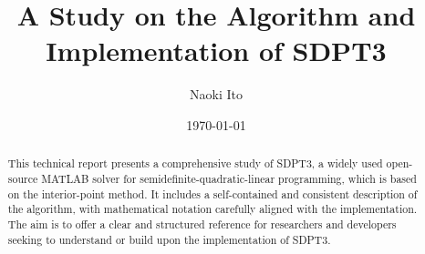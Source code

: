 \documentclass{scrartcl}
\title{A Study on the Algorithm and Implementation of SDPT3}
\author{
    Naoki Ito
}
\date{\today}
\begin{document}
\maketitle
\begin{abstract}
This technical report presents a comprehensive study of SDPT3, a widely used open-source MATLAB solver for semidefinite-quadratic-linear programming, which is based on the interior-point method.
It includes a self-contained and consistent description of the algorithm, with mathematical notation carefully aligned with the implementation.
The aim is to offer a clear and structured reference for researchers and developers seeking to understand or build upon the implementation of SDPT3.
\end{abstract}

\tableofcontents








\appendix




\end{document}
